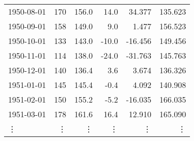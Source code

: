 \begin{tabular}{l|rrrrr}
1950-08-01 & 170 & 156.0 & 14.0 & 34.377 & 135.623 \\
1950-09-01 & 158 & 149.0 & 9.0 & 1.477 & 156.523 \\
1950-10-01 & 133 & 143.0 & -10.0 & -16.456 & 149.456 \\
1950-11-01 & 114 & 138.0 & -24.0 & -31.763 & 145.763 \\
1950-12-01 & 140 & 136.4 & 3.6 & 3.674 & 136.326 \\
1951-01-01 & 145 & 145.4 & -0.4 & 4.092 & 140.908 \\
1951-02-01 & 150 & 155.2 & -5.2 & -16.035 & 166.035 \\
1951-03-01 & 178 & 161.6 & \cellcolor{lblue}16.4 & \cellcolor{blue}12.910 & 165.090 \\
\vdots & \vdots & \vdots & \vdots & \vdots & \vdots \\
\bottomrule 
\end{tabular}

